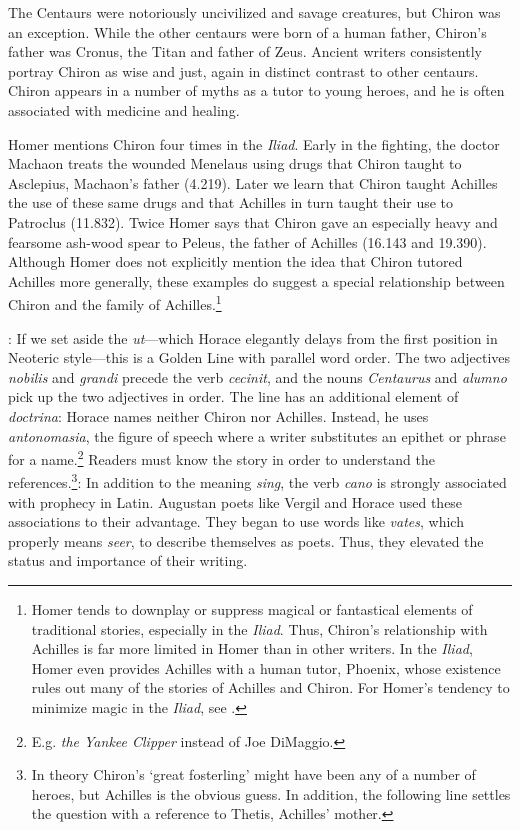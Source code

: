 The Centaurs were notoriously uncivilized and savage creatures, but Chiron was
an exception.  While the other centaurs were born of a human father, Chiron's
father was Cronus, the Titan and father of Zeus.  Ancient writers consistently
portray Chiron as wise and just, again in distinct contrast to other centaurs.
Chiron appears in a number of myths as a tutor to young heroes, and he is
often associated with medicine and healing.

Homer mentions Chiron four times in the \textit{Iliad}.  Early in the
fighting, the doctor Machaon treats the wounded Menelaus using drugs that
Chiron taught to Asclepius, Machaon's father (4.219).  Later we learn that
Chiron taught Achilles the use of these same drugs and that Achilles in turn
taught their use to Patroclus (11.832).  Twice Homer says that Chiron gave an
especially heavy and fearsome ash-wood spear to Peleus, the father of Achilles
(16.143 and 19.390).  Although Homer does not explicitly mention the idea that
Chiron tutored Achilles more generally, these examples do suggest a special
relationship between Chiron and the family of Achilles.\footnote{Homer tends
to downplay or suppress magical or fantastical elements of traditional stories,
especially in the \textit{Iliad}. Thus, Chiron's relationship with Achilles
is far more limited in Homer than in other writers.  In the \textit{Iliad},
Homer even provides Achilles with a human tutor, Phoenix, whose existence
rules out many of the stories of Achilles and Chiron.  For Homer's tendency
to minimize magic in the \textit{Iliad}, see \citet[165 ff.]{griffin1983}.}


: If we set aside the \textit{ut}---which Horace
elegantly delays from the first position in Neoteric style---this is a Golden
Line with parallel word order.  The two adjectives \textit{nobilis} and
\textit{grandi} precede the verb \textit{cecinit}, and the nouns
\textit{Centaurus} and \textit{alumno} pick up the two adjectives in order.
The line has an additional element of \textit{doctrina}: Horace names neither
Chiron nor Achilles.  Instead, he uses \textit{antonomasia}, the figure of
speech where a writer substitutes an epithet or phrase for
a name.\footnote{E.g. \textit{the Yankee Clipper} instead of Joe DiMaggio.}
Readers must know the story in order to understand the references.\footnote{In
theory Chiron's `great fosterling' might have been any of a number of heroes,
but Achilles is the obvious guess.  In addition, the following line settles the
question with a reference to Thetis, Achilles' mother.}\indent{}: In
addition to the meaning \textit{sing}, the verb \textit{cano} is strongly
associated with prophecy in Latin.  Augustan poets like Vergil and Horace used
these associations to their advantage.  They began to use words like
\textit{vates}, which properly means \textit{seer}, to describe themselves as
poets.  Thus, they elevated the status and importance of their writing.

